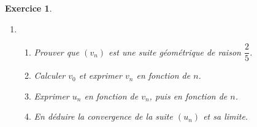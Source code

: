 \documentclass[12pt,a4paper,french]{article}
\theoremstyle{break}
\newtheorem{exercice}{Exercice}
\theoremstyle{nonumberplain}
\theoremstyle{nonumberbreak}
\begin{document}
\begin{exercice}
\begin{enumerate}
      On considère la suite $\left(v_{n}\right)$ definie par $v_{n} =
      \dfrac{u_{n} - 1}{u_{n} + 2}$.

    \item \begin{enumerate} \item Prouver que $\left(v_{n}\right)$ est
          une suite géométrique de raison $\dfrac{2}{5}$.

        \item Calculer $v_{0}$ et exprimer $v_{n}$ en fonction de $n$.
        \item Exprimer $u_{n}$ en fonction de $v_{n}$, puis en fonction
          de $n$.
        \item En déduire la convergence de la suite $\left(u_{n}\right)$
          et sa limite.
      \end{enumerate}
  \end{enumerate}
\end{exercice}

\pagebreak
\end{document}
